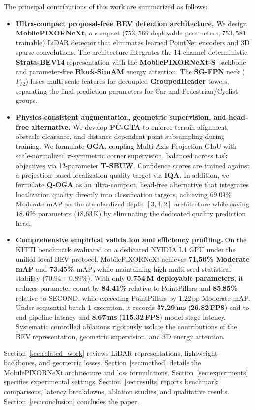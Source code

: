 The principal contributions of this work are summarized as follows:
\begin{itemize}
    \item \textbf{Ultra-compact proposal-free BEV detection architecture.} We design \textbf{MobilePIXORNeXt}, a compact ($753{,}569$ deployable parameters, $753{,}581$ trainable) LiDAR detector that eliminates learned PointNet encoders and 3D sparse convolutions. The architecture integrates the 14-channel deterministic \textbf{Strata-BEV14} representation with the \textbf{MobilePIXORNeXt-S} backbone and parameter-free \textbf{Block-SimAM} energy attention. The \textbf{SG-FPN} neck ($F_{32}$) fuses multi-scale features for decoupled \textbf{GroupedHeader} towers, separating the final prediction parameters for Car and Pedestrian/Cyclist groups.
    
    \item \textbf{Physics-consistent augmentation, geometric supervision, and head-free alternative.} We develop \textbf{PC-GTA} to enforce terrain alignment, obstacle clearance, and distance-dependent point subsampling during training. We formulate \textbf{OGA}, coupling Multi-Axis Projection GIoU with scale-normalized $\pi$-symmetric corner supervision, balanced across task objectives via 12-parameter \textbf{T-SBUW}. Confidence scores are trained against a projection-based localization-quality target via \textbf{IQA}. In addition, we formulate \textbf{Q-OGA} as an ultra-compact, head-free alternative that integrates localization quality directly into classification targets, achieving $69.09\%$ Moderate mAP on the standardized depth $[3, 4, 2]$ architecture while saving $18{,}626$ parameters ($18.63\,\text{K}$) by eliminating the dedicated quality prediction head.
    
    \item \textbf{Comprehensive empirical validation and efficiency profiling.} On the KITTI benchmark evaluated on a dedicated NVIDIA L4 GPU under the unified local BEV protocol, MobilePIXORNeXt achieves \textbf{71.50\% Moderate mAP} and \textbf{73.45\% $\text{mAP}_9$} while maintaining high multi-seed statistical stability ($70.94 \pm 0.89\%$). With only \textbf{0.754\,M deployable parameters}, it reduces parameter count by \textbf{84.41\%} relative to PointPillars and \textbf{85.85\%} relative to SECOND, while exceeding PointPillars by $1.22\,\text{pp}$ Moderate mAP. Under sequential batch-1 execution, it records \textbf{37.29\,ms} (\textbf{26.82\,FPS}) end-to-end pipeline latency and \textbf{8.67\,ms} (\textbf{115.32\,FPS}) model-stage latency. Systematic controlled ablations rigorously isolate the contributions of the BEV representation, geometric supervision, and 3D energy attention.
\end{itemize}

Section~\ref{sec:related_work} reviews LiDAR representations, lightweight backbones, and geometric losses. Section~\ref{sec:method} details the MobilePIXORNeXt architecture and loss formulations. Section~\ref{sec:experiments} specifies experimental settings. Section~\ref{sec:results} reports benchmark comparisons, latency breakdowns, ablation studies, and qualitative results. Section~\ref{sec:conclusion} concludes the paper.
